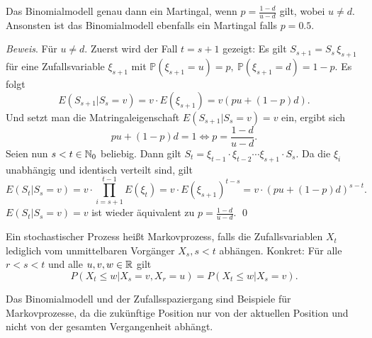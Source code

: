 \begin{bsp}
Das Binomialmodell genau dann ein Martingal, wenn $p=\frac{1-d}{u-d}$ gilt, wobei $u \neq d$. 
Ansonsten ist das Binomialmodell ebenfalls ein Martingal falls $p=0.5$.

\textit{Beweis}. Für $u \neq d$.
Zuerst wird der Fall $t = s + 1$ gezeigt:
Es gilt $S_{s+1}=S_s\,\xi_{s+1}$ für eine Zufallsvariable $\xi_{s+1}$ mit $\mathbb{P}(\xi_{s+1}=u)=p,\ \mathbb{P}(\xi_{s+1}=d)=1-p$. Es folgt
$$E(S_{s+1}|S_s=v)= v \cdot E(\xi_{s+1})=v(pu+(1-p)d).$$
Und setzt man die Matringaleigenschaft $E(S_{s+1}|S_s=v)=v$ ein, ergibt sich
$$pu+(1-p)d=1 \iff p=\frac{1-d}{u-d}.$$
Seien nun $s < t \in \Bbb N_0$ beliebig. Dann gilt $S_t=\xi_{t-1}\cdot \xi_{t-2}\cdots \xi_{s+1}\cdot S_s$. 
Da die $\xi_i$ unabhängig und identisch verteilt sind, gilt
$$E(S_t|S_s=v)=v \cdot \prod_{i=s+1}^{t-1} E(\xi_t)=v \cdot E(\xi_{s+1})^{t-s}=v \cdot (pu+(1-p)d)^{s-t}.$$
$E(S_t|S_s=v)=v$ ist wieder äquivalent zu $p=\frac{1-d}{u-d}$. \qed
\end{bsp}

\begin{defi}[Markovprozess]
Ein stochastischer Prozess heißt Markovprozess, falls die 
Zufallsvariablen $X_t$ lediglich vom unmittelbaren Vorgänger $X_s, s \lt t$ abhängen.
Konkret: Für alle $r \lt s \lt t$ und alle $u, v, w \in \Bbb R$ gilt
$$P(X_t \le w | X_s = v, X_r=u) = P(X_t \le w|X_s=v).$$
\end{defi}

\begin{bsp}
Das Binomialmodell und der Zufallsspaziergang sind Beispiele für Markovprozesse, da die zukünftige Position 
nur von der aktuellen Position und nicht von der gesamten Vergangenheit abhängt.
\end{bsp}